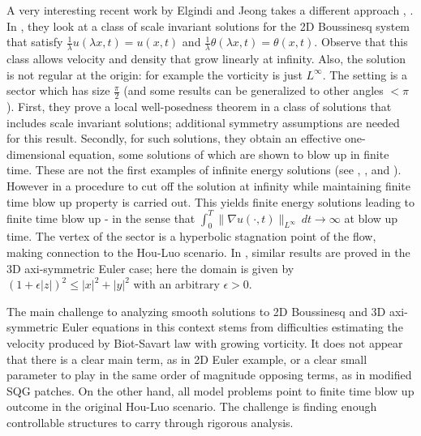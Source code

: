 \documentclass[reqno,centertags, 11pt]{amsart}
\begin{document}
A very interesting recent work by Elgindi and Jeong takes a different approach \cite{EJ1}, \cite{EJ2}. In \cite{EJ1}, they look at a class of scale invariant
solutions for the 2D Boussinesq system that satisfy $\frac{1}{\lambda} u(\lambda x,t) = u(x,t)$ and
$\frac{1}{\lambda} \theta(\lambda x,t) = \theta(x,t).$ Observe that this class allows velocity and density that grow linearly at infinity.
Also, the solution is not regular at the origin: for example the vorticity is just $L^\infty.$
The setting is a sector which has size $\frac{\pi}{2}$ (and some results can be generalized to other angles $<\pi$).
First, they prove a local well-posedness theorem in a class of solutions that includes scale invariant solutions; additional symmetry assumptions
are needed for this result. Secondly, for such solutions, they obtain an effective one-dimensional equation, some solutions of which
are shown to blow up in finite time. These are not the first examples of infinite energy solutions (see \cite{Childr}, \cite{Const},
and \cite{jWu}). However in \cite{EJ1} a procedure to cut off the solution at infinity while maintaining finite time blow up property
is carried out. This yields finite energy solutions leading to finite time blow up - in the sense that $\int_0^T
\|\nabla u(\cdot, t)\|_{L^\infty}\,dt \rightarrow \infty $ at blow up time. The vertex of the sector is a hyperbolic stagnation point
of the flow, making connection to the Hou-Luo scenario. 
In \cite{EJ2}, similar results are proved in the 3D axi-symmetric
Euler case; here the domain is given by $(1+\epsilon |z|)^2 \leq |x|^2+|y|^2$ with an arbitrary $\epsilon >0.$ 

The main challenge to analyzing smooth solutions to 2D Boussinesq and 3D axi-symmetric Euler equations in this context stems from difficulties estimating
the velocity produced by Biot-Savart law with growing vorticity. It does not appear that there is a clear main term, as in 2D Euler example,
or a clear small parameter to play in the same order of magnitude opposing terms, as in modified SQG patches. On the other hand, all model problems
point to finite time blow up outcome in the original Hou-Luo scenario. The challenge is finding enough controllable structures to
carry through rigorous analysis.
\end{document}
